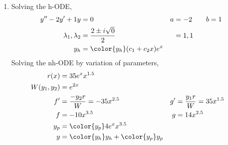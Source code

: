 \begin{enumerate}
    \item Solving the h-ODE,
          \begin{align}
              y'' - 2y' + 1y           & = 0                                   &
              a                        & = -2 \qquad b = 1                       \\
              \lambda_{1}, \lambda_{2} & = \frac{2 \pm i\sqrt{0}}{2}           &
                                       & = 1, 1                                  \\
              y_{h}                    & = {\color{y_h} (c_{1} + c_{2}x)e^{x}}
          \end{align}
          Solving the nh-ODE by variation of parameters,
          \begin{align}
              r(x)            & = 35e^{x}x^{1.5}                              \\
              W(y_{1}, y_{2}) & = e^{2x}                                      \\
              f'              & = \frac{-y_{2}r}{W} = -35x^{2.5}            &
              g'              & = \frac{y_{1}r}{W} = 35x^{1.5}                \\
              f               & = -10x^{3.5}                                &
              g               & = 14x^{2.5}                                   \\
              y_{p}           & = {\color{y_p} 4e^{x}x^{3.5}}                 \\
              y               & = {\color{y_h} y_{h}} + {\color{y_p} y_{p}}
          \end{align}


\end{enumerate}

